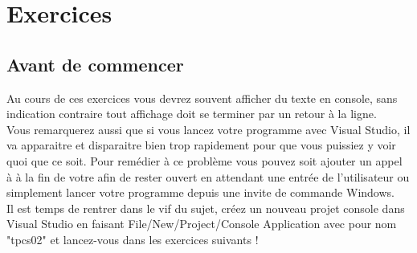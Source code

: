 \section{Exercices}

\subsection{Avant de commencer}
Au cours de ces exercices vous devrez souvent afficher du texte en console,
sans indication contraire tout affichage doit se terminer par un retour à la
ligne.\\
Vous remarquerez aussi que si vous lancez votre programme avec Visual Studio,
il va apparaitre et disparaitre bien trop rapidement pour que vous puissiez y
voir quoi que ce soit. Pour remédier à ce problème vous pouvez soit ajouter un
appel à  à la fin de votre  afin de rester ouvert en
attendant une entrée de l'utilisateur ou simplement lancer votre programme
depuis une invite de commande Windows.\\

Il est temps de rentrer dans le vif du sujet, créez un nouveau projet console
dans Visual Studio en faisant File/New/Project/Console Application avec pour
nom "tpcs02" et lancez-vous dans les exercices suivants !\\
















